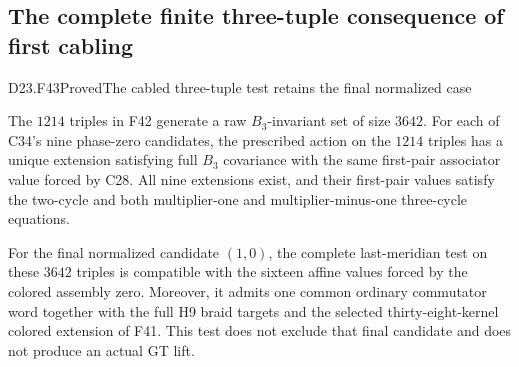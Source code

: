 \subsection{The complete finite three-tuple consequence of first cabling}

\begin{statement}{D23.F43}{Proved}{The cabled three-tuple test retains the final normalized case}
\end{statement}
The $1214$ triples in F42 generate a raw $B_3$-invariant set
of size $3642$. For each of C34's nine phase-zero candidates,
the prescribed action on the $1214$ triples has a unique
extension satisfying full $B_3$ covariance with the same
first-pair associator value forced by C28. All nine
extensions exist, and their first-pair values satisfy the
two-cycle and both multiplier-one and multiplier-minus-one
three-cycle equations.

For the final normalized candidate $(1,0)$, the complete
last-meridian test on these $3642$ triples is compatible
with the sixteen affine values forced by the colored
assembly zero. Moreover, it admits one common ordinary
commutator word together with the full H9 braid targets
and the selected thirty-eight-kernel colored extension
of F41. This test does not exclude that final candidate
and does not produce an actual GT lift.

